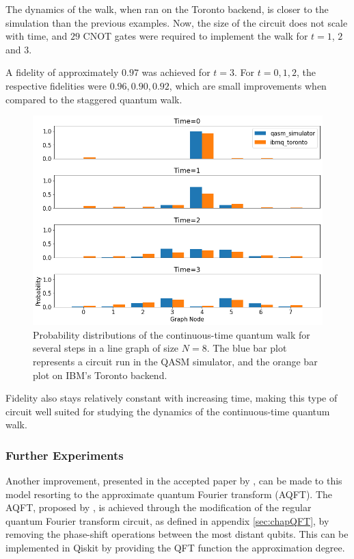 \documentclass[../../dissertation.tex]{subfiles}
\begin{document}
The dynamics of the walk, when ran on the Toronto backend, is closer to the
simulation than the previous examples. Now, the size of the
circuit does not scale with time, and $29$ CNOT gates were required to implement the walk for $t = 1$, $2$ and $3$. \par
A fidelity of approximately $0.97$ was
achieved for $t=3$. For $t=0, 1, 2$, the respective fidelities were $0.96, 0.90,
0.92$, which are small improvements when compared to the staggered quantum
walk.
\begin{figure}[!h]
	\centering
	\includegraphics[scale=0.4]{img/Qiskit/ContQuantumWalk/ContQW_N3_S0123.png}
	\caption{Probability distributions of the continuous-time quantum walk for several steps in a line graph of size $N=8$. The blue bar plot represents a circuit run in the QASM simulator, and the orange bar plot on IBM's Toronto backend.} 
	\label{fig:contQWQiskitDist}
\end{figure}
Fidelity also stays relatively constant with increasing time, making this type
of circuit well suited for studying the dynamics of the continuous-time quantum
walk.

\subsubsection{Further Experiments}
Another improvement, presented in the accepted paper by \cite{chagassantos21}, can be made to this model resorting to the approximate quantum
Fourier transform (AQFT). The AQFT, proposed by \cite{Coppersmith94}, is
achieved through the modification of the regular quantum Fourier transform
circuit, as defined in appendix \ref{sec:chapQFT}, by removing the phase-shift
operations between the most distant qubits. This can be implemented in Qiskit
by providing the QFT function the approximation degree.\par
\end{document}
